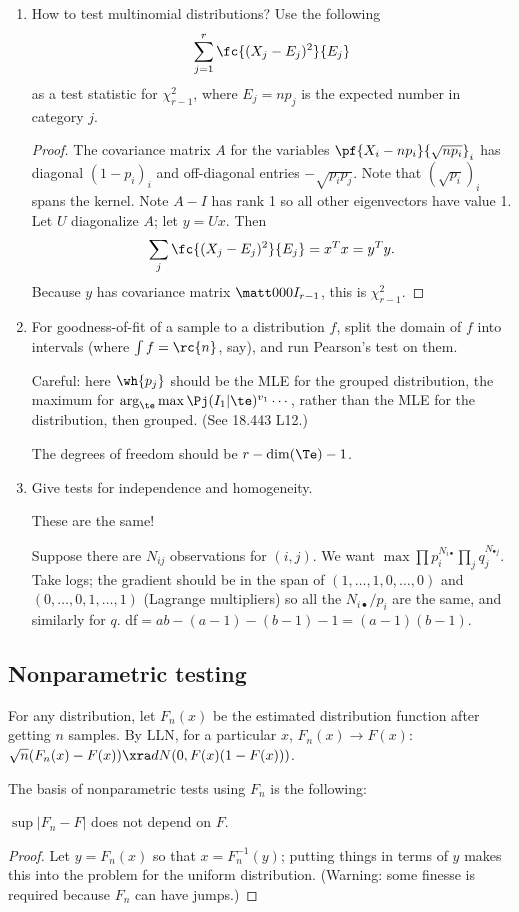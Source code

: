 \begin{enumerate}
\item
How to test multinomial distributions? Use the following
\[
\sum_{j=1}^r \fc{(X_j-E_j)^2}{E_j}
\]
as a test statistic for $\chi_{r-1}^2$, where $E_j=np_j$ is the expected number in category $j$.
\begin{proof}
The covariance matrix $A$ for the variables $\pf{X_i-np_i}{\sqrt{np_i}}_i$ has diagonal $(1-p_i)_i$ and off-diagonal entries $-\sqrt{p_ip_j}$. Note that $(\sqrt{p_i})_i$ spans the kernel. Note $A-I$ has rank 1 so all other eigenvectors have value 1. Let $U$ diagonalize $A$; let $y=Ux$. Then 
\[
\sum_j \fc{(X_j-E_j)^2}{E_j} = x^Tx = y^Ty.
\]
Because $y$ has covariance matrix $\matt 000{I_{r-1}}$, this is $\chi_{r-1}^2$.
\end{proof}
\item
For goodness-of-fit of a sample to a distribution $f$, split the domain of $f$ into intervals (where $\int f=\rc{n}$, say), and run Pearson's test on them.

Careful: here $\wh{p_j}$ should be the MLE for the grouped distribution, the maximum for $\arg_\te\max \Pj(I_1|\te)^{v_1}\cdots$, rather than the MLE for the distribution, then grouped. (See 18.443 L12.)

The degrees of freedom should be $r-\dim(\Te)-1$.

\item
Give tests for independence and homogeneity.

These are the same!

Suppose there are $N_{ij}$ observations for $(i,j)$. We want $\max \prod p_i^{N_{i\bullet}}\prod_j q_j^{N_{\bullet j}}$. Take logs; the gradient should be in the span of $(1,\ldots,1,0,\ldots,0)$ and $(0,\ldots,0,1,\ldots,1)$ (Lagrange multipliers) so all the $N_{i\bullet}/p_i$ are the same, and similarly for $q$.  df$=ab-(a-1)-(b-1)-1=(a-1)(b-1)$.

\end{enumerate}

\subsection{Nonparametric testing}

For any distribution, let $F_n(x)$ be the estimated distribution function after getting $n$ samples. By LLN, for a particular $x$, $F_n(x)\to F(x)$: $\sqrt{n}(F_n(x)-F(x))\xra d N(0,F(x)(1-F(x)))$.

The basis of nonparametric tests using $F_n$ is the following: 
\begin{thm}
$\sup|F_n-F|$ does not depend on $F$. 
\end{thm}
\begin{proof}
Let $y=F_n(x)$ so that $x=F_n^{-1}(y)$; putting things in terms of $y$ makes this into the problem for the uniform distribution. (Warning: some finesse is required because $F_n$ can have jumps.)
\end{proof}

